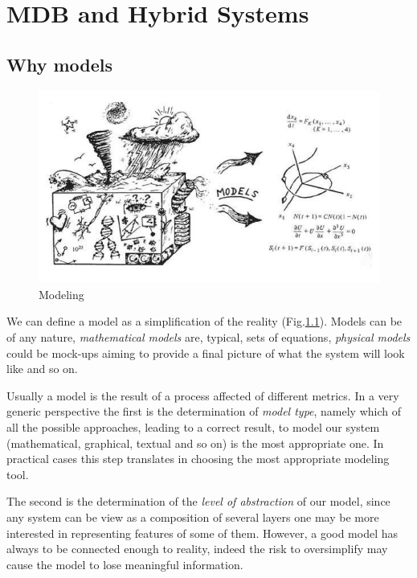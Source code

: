 \chapter{MDB and Hybrid Systems}

\section{Why models}
\begin{figure}[!h]
	\centering 
     \includegraphics[width=.9\textwidth]{Figs/models.PNG} 
     \caption{Modeling} 
     \label{fig:models} 
\end{figure} 
We can define a model as a simplification of the reality (Fig.\ref{fig:models}). Models can be of any nature, \textit{mathematical models} are, typical, sets of equations, \textit{physical models} could be mock-ups aiming to provide a final picture of what the system will look like and so on.
\par Usually a model is the result of a process affected of different metrics. In a very generic perspective the first is the determination of \textit{model type}, namely which of all the possible approaches, leading to a correct result, to model our system (mathematical, graphical, textual and so on) is the most appropriate one. In practical cases this step translates in choosing the most appropriate modeling tool.
\par The second is the determination of the \textit{level of abstraction} of our model, since any system can be view as a composition of several layers one may be more interested in representing features of some of them. However, a good model has always to be connected enough to reality, indeed the risk to oversimplify may cause the model to lose meaningful information. 
